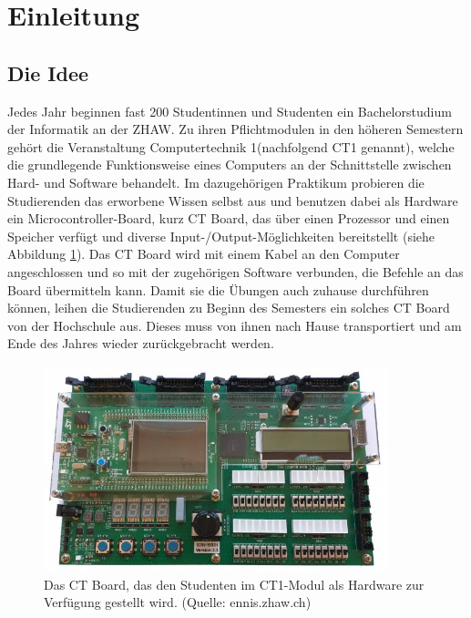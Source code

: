 \documentclass[10pt]{article}
\begin{document}
\newpage

\tableofcontents
\thispagestyle{empty}

\newpage 

\pagestyle{headings}

\section{Einleitung}

\subsection{Die Idee}

Jedes Jahr beginnen fast 200 Studentinnen und Studenten ein Bachelorstudium der Informatik an der ZHAW. Zu ihren Pflichtmodulen in den höheren Semestern gehört die Veranstaltung \glqq Computertechnik 1\grqq (nachfolgend CT1 genannt), welche die grundlegende Funktionsweise eines Computers an der Schnittstelle zwischen Hard- und Software behandelt. Im dazugehörigen Praktikum probieren die Studierenden das erworbene Wissen selbst aus und benutzen dabei als Hardware ein Microcontroller-Board, kurz CT Board, das über einen Prozessor und einen Speicher verfügt und diverse Input-/Output-Möglichkeiten bereitstellt (siehe Abbildung \ref{ctboard}). Das CT Board wird mit einem Kabel an den Computer angeschlossen und so mit der zugehörigen Software verbunden, die Befehle an das Board übermitteln kann. Damit sie die Übungen auch zuhause durchführen können, leihen die Studierenden zu Beginn des Semesters ein solches CT Board von der Hochschule aus. Dieses muss von ihnen nach Hause transportiert und am Ende des Jahres wieder zurückgebracht werden.

\begin{figure}[h]
\includegraphics[width=10cm]{ctboard}
\centering
\caption{Das CT Board, das den Studenten im CT1-Modul als Hardware zur Verfügung gestellt wird. (Quelle: ennis.zhaw.ch)}
\label{ctboard}
\end{figure}
\end{document}
